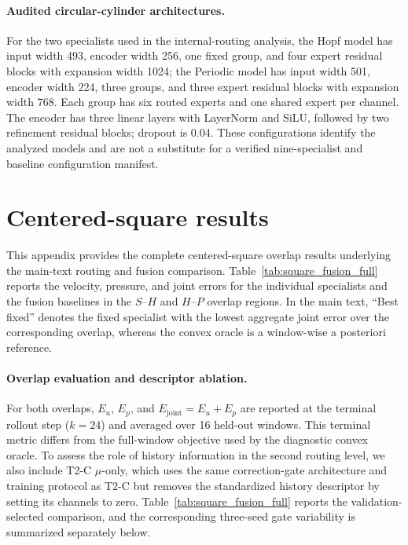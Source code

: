 \documentclass{article}
\begin{document}
\paragraph{Audited circular-cylinder architectures.}
For the two specialists used in the internal-routing analysis, the Hopf model has input width 493, encoder width 256, one fixed group, and four expert residual blocks with expansion width 1024; the Periodic model has input width 501, encoder width 224, three groups, and three expert residual blocks with expansion width 768. Each group has six routed experts and one shared expert per channel. The encoder has three linear layers with LayerNorm and SiLU, followed by two refinement residual blocks; dropout is 0.04. These configurations identify the analyzed models and are not a substitute for a verified nine-specialist and baseline configuration manifest.

\FloatBarrier
\section{Centered-square results}
\label{app:square}


This appendix provides the complete centered-square overlap results
underlying the main-text routing and fusion comparison. Table~\ref{tab:square_fusion_full} reports the velocity, pressure,
and joint errors for the individual specialists and the fusion baselines in the $S$--$H$ and $H$--$P$ overlap regions. In the main text, ``Best fixed'' denotes the fixed specialist with the
lowest aggregate joint error over the corresponding overlap, whereas the convex oracle is a window-wise a posteriori reference.



\paragraph{Overlap evaluation and descriptor ablation.}
For both overlaps, $E_u$, $E_p$, and $E_{\mathrm{joint}}=E_u+E_p$ are reported at the terminal rollout step ($k=24$) and averaged over 16 held-out windows.  This terminal metric differs from the full-window objective used by the diagnostic convex oracle. To assess the role of history information in the second routing level, we also include T2-C $\mu$-only, which uses the same correction-gate architecture and training protocol as T2-C but removes the standardized history descriptor by setting its channels to zero. Table~\ref{tab:square_fusion_full} reports the validation-selected comparison, and the corresponding three-seed gate variability is summarized separately below.
\end{document}

